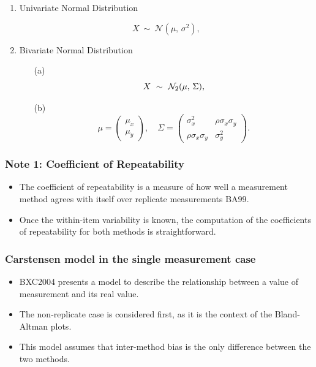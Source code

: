 \documentclass[compress]{beamer}        %
\begin{document}
\begin{frame}

\begin{enumerate}
\item Univariate Normal Distribution

\[
    X\ \sim\ \mathcal{N}(\mu,\, \sigma^2),
\]

\item Bivariate Normal Distribution

\begin{itemize}
\item[(a)] \[  X\ \sim\ \mathcal{N}_2(\mu,\, \Sigma), \vspace{1cm}\]
\item[(b)] \[    \mu = \begin{pmatrix} \mu_x \\ \mu_y \end{pmatrix}, \quad
    \Sigma = \begin{pmatrix} \sigma_x^2 & \rho \sigma_x \sigma_y \\
                             \rho \sigma_x \sigma_y  & \sigma_y^2 \end{pmatrix}.\]
\end{itemize}
\end{enumerate}


\end{frame}

\begin{frame}
\frametitle{Note 1: Coefficient of Repeatability}
\begin{itemize}
\item 
The coefficient of repeatability is a measure of how well a
measurement method agrees with itself over replicate measurements
\alert{BA99}. 

\item Once the within-item variability is known, the
computation of the coefficients of repeatability for both methods
is straightforward.

\end{itemize}
\end{frame}

\begin{frame}
\frametitle{Carstensen model in the single measurement case}
\begin{itemize}
\item \alert{BXC2004} presents a model to describe the relationship between a value of measurement and its real value.
\item The non-replicate case is considered first, as it is the context of the Bland-Altman plots.
\item This model assumes that inter-method bias is the only difference between the two methods.
\end{itemize}
\end{frame}
\end{document}
